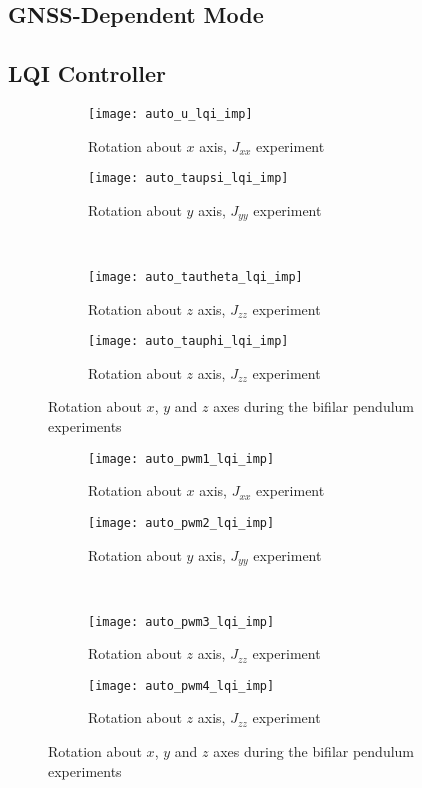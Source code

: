 \begin{appendices}
\section*{GNSS-Dependent Mode}

\subsection*{LQI Controller}

\begin{figure}[H]
\begin{subfigure}{.5\linewidth}
\centering
\texttt{[image: auto\_u\_lqi\_imp]}
\caption{Rotation about $x$ axis, $J_{xx}$ experiment}
\label{fig:auto_u_lqi_imp}
\end{subfigure}%
\begin{subfigure}{.5\linewidth}
\centering
\texttt{[image: auto\_taupsi\_lqi\_imp]}
\caption{Rotation about $y$ axis, $J_{yy}$ experiment}
\label{fig:auto_taupsi_lqi_imp}
\end{subfigure}\\[1ex]
\begin{subfigure}{0.5\linewidth}
\centering
\texttt{[image: auto\_tautheta\_lqi\_imp]}
\caption{Rotation about $z$ axis, $J_{zz}$ experiment}
\label{fig:auto_tautheta_lqi_imp}
\end{subfigure}
\begin{subfigure}{0.5\linewidth}
\centering
\texttt{[image: auto\_tauphi\_lqi\_imp]}
\caption{Rotation about $z$ axis, $J_{zz}$ experiment}
\label{fig:auto_tauphi_h_lqi}
\end{subfigure}
\caption{Rotation about $x$, $y$ and $z$ axes during the bifilar pendulum experiments}
\label{fig:auto_control_lqi}
\end{figure}

\begin{figure}[H]
\begin{subfigure}{.5\linewidth}
\centering
\texttt{[image: auto\_pwm1\_lqi\_imp]}
\caption{Rotation about $x$ axis, $J_{xx}$ experiment}
\label{fig:auto_pwm_lqi_imp}
\end{subfigure}%
\begin{subfigure}{.5\linewidth}
\centering
\texttt{[image: auto\_pwm2\_lqi\_imp]}
\caption{Rotation about $y$ axis, $J_{yy}$ experiment}
\label{fig:auto_pwm2_lqi_imp}
\end{subfigure}\\[1ex]
\begin{subfigure}{0.5\linewidth}
\centering
\texttt{[image: auto\_pwm3\_lqi\_imp]}
\caption{Rotation about $z$ axis, $J_{zz}$ experiment}
\label{fig:auto_pwm3_lqi_imp}
\end{subfigure}
\begin{subfigure}{0.5\linewidth}
\centering
\texttt{[image: auto\_pwm4\_lqi\_imp]}
\caption{Rotation about $z$ axis, $J_{zz}$ experiment}
\label{fig:auto_pwm4_lqi_imp}
\end{subfigure}
\caption{Rotation about $x$, $y$ and $z$ axes during the bifilar pendulum experiments}
\label{fig:auto_pwm_lqi}
\end{figure}




\end{appendices}
